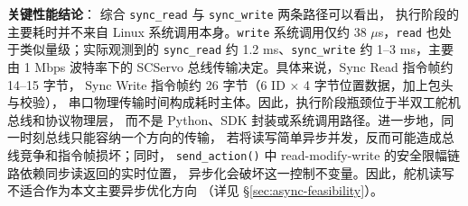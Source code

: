 \textbf{关键性能结论}\label{sec:execution-conclusion}：
综合 \texttt{sync\_read} 与 \texttt{sync\_write} 两条路径可以看出，
执行阶段的主要耗时并不来自 Linux 系统调用本身。\texttt{write} 系统调用仅约
38 $\mu$s，\texttt{read} 也处于类似量级；实际观测到的 \texttt{sync\_read}
约 1.2 ms、\texttt{sync\_write} 约 1--3 ms，主要由 1 Mbps 波特率下的
SCServo 总线传输决定。具体来说，Sync Read 指令帧约 14--15 字节，
Sync Write 指令帧约 26 字节（6 ID $\times$ 4 字节位置数据，加上包头与校验），
串口物理传输时间构成耗时主体。因此，执行阶段瓶颈位于半双工舵机总线和协议物理层，
而不是 Python、SDK 封装或系统调用路径。进一步地，同一时刻总线只能容纳一个方向的传输，
若将读写简单异步并发，反而可能造成总线竞争和指令帧损坏；同时，
\texttt{send\_action()} 中 read-modify-write 的安全限幅链路依赖同步读返回的实时位置，
异步化会破坏这一控制不变量。因此，舵机读写不适合作为本文主要异步优化方向
（详见 \S\ref{sec:async-feasibility}）。

